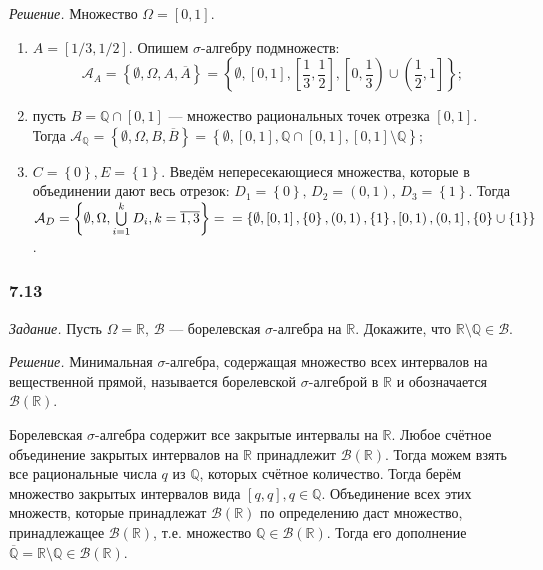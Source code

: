 \textit{Решение.} Множество $ \Omega = \left[ 0, 1 \right] $.

\begin{enumerate}[label=\alph*)]
\item $A = \left[ 1/3, 1/2 \right] $.
Опишем $ \sigma $-алгебру подмножеств:
$$ \mathcal{A}_A =
\left\{ \emptyset, \Omega, A, \overline{A} \right\} =
\left\{ \emptyset, \left[ 0, 1 \right],
\left[ \frac{1}{3}, \frac{1}{2} \right], \left[ 0, \frac{1}{3} \right) \cup \left( \frac{1}{2}, 1 \right] \right\};$$
\item пусть $B = \mathbb{Q} \cap \left[ 0, 1 \right] $ --- множество рациональных точек отрезка $ \left[ 0, 1 \right] $.
Тогда
$ \mathcal{A}_{ \mathbb{Q} } =
\left\{ \emptyset, \Omega, B, \overline{B} \right\} =
\left\{ \emptyset, \left[ 0, 1 \right], \mathbb{Q} \cap \left[ 0, 1 \right], \left[ 0, 1 \right] \setminus \mathbb{Q} \right\};$
\item $C = \left\{ 0 \right\}, E = \left\{ 1 \right\} $.
Введём непересекающиеся множества,
которые в объединении дают весь отрезок: $D_1 = \left\{ 0 \right\}, \, D_2 = \left( 0, 1 \right), \, D_3 = \left\{ 1 \right\} $.
Тогда
$ \mathcal{A}_D =
\left\{ \emptyset, \Omega, \bigcup \limits_{i=1}^k D_i, k = \overline{1, 3} \right\} = \\
= \left\{ \emptyset, \left[0, 1 \right], \left\{ 0 \right\}, \left( 0, 1 \right),
\left\{ 1 \right\}, \left[0, 1 \right), \left(0, 1 \right], \left\{ 0 \right\} \cup \left\{ 1 \right\} \right\} $.
\end{enumerate}

\subsubsection*{7.13}

\textit{Задание.} Пусть $ \Omega = \mathbb{R}, \, \mathcal{B} $ --- борелевская $ \sigma $-алгебра на $ \mathbb{R} $.
Докажите, что $ \mathbb{R} \setminus \mathbb{Q} \in \mathcal{B} $.

\textit{Решение.} Минимальная $ \sigma $-алгебра,
содержащая множество всех интервалов на вещественной прямой,
называется борелевской $ \sigma $-алгеброй в $ \mathbb{R} $ и обозначается $ \mathcal{B} \left( \mathbb{R} \right) $.

Борелевская $ \sigma $-алгебра содержит все закрытые интервалы на $ \mathbb{R} $.
Любое счётное объединение закрытых интервалов на $ \mathbb{R} $ принадлежит $ \mathcal{B} \left( \mathbb{R} \right) $.
Тогда можем взять все рациональные числа $q$ из $ \mathbb{Q} $, которых счётное количество.
Тогда берём множество закрытых интервалов вида $ \left[ q, q \right], q \in \mathbb{Q} $.
Объединение всех этих множеств,
которые принадлежат $ \mathcal{B} \left( \mathbb{R} \right) $ по определению даст множество,
принадлежащее $ \mathcal{B} \left( \mathbb{R} \right) $, т.е. множество $ \mathbb{Q} \in \mathcal{B} \left( \mathbb{R} \right) $.
Тогда его дополнение $ \overline{ \mathbb{Q} } = \mathbb{R} \setminus \mathbb{Q} \in \mathcal{B} \left( \mathbb{R} \right) $.

